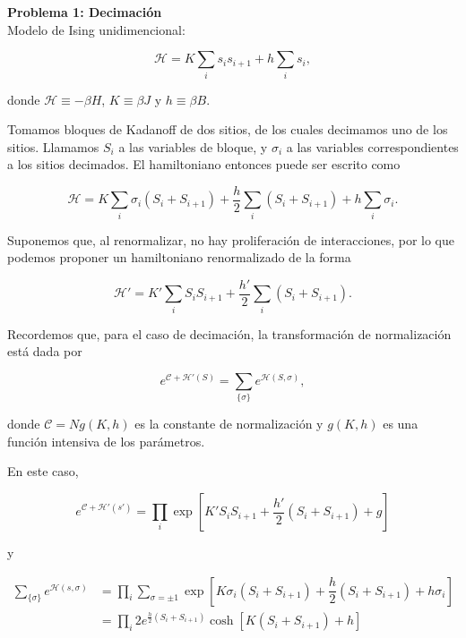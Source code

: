 \documentclass[10pt]{article}
\begin{document}
\textbf{Problema 1: Decimaci\'on}
\\

Modelo de Ising unidimencional:

\begin{equation}
\mathcal{H} = K \sum_i s_i s_{i+1} + h \sum_i s_i,
\end{equation}

donde $\mathcal{H} \equiv -\beta H$, $K\equiv \beta J$ y $h \equiv \beta B$.

Tomamos bloques de Kadanoff de dos sitios, de los cuales decimamos uno de los sitios. Llamamos $S_i$ a las variables de bloque, y $\sigma_i$ a las variables correspondientes a los sitios decimados. El hamiltoniano entonces puede ser escrito como

\begin{equation}
\mathcal{H} = K \sum_i \sigma_i (S_i + S_{i+1}) + \dfrac{h}{2} \sum_i (S_i + S_{i+1}) + h \sum_i \sigma_i.
\end{equation}

Suponemos que, al renormalizar, no hay proliferaci\'on de interacciones, por lo que podemos proponer un hamiltoniano renormalizado de la forma

\begin{equation}
\mathcal{H}' = K' \sum_i S_i S_{i+1} + \dfrac{h'}{2} \sum_i (S_i + S_{i+1}).
\end{equation}

Recordemos que, para el caso de decimaci\'on, la transformaci\'on de normalizaci\'on est\'a dada por 

\begin{equation}
e^{\mathcal{C} + \mathcal{H}'(S)} = \sum_{\lbrace \sigma\rbrace} e^{\mathcal{H}(S,\sigma)},
\end{equation}

donde $\mathcal{C} = Ng(K,h)$ es la constante de normalizaci\'on y $g(K,h)$ es una funci\'on intensiva de los par\'ametros.

En este caso,

\begin{equation}
e^{\mathcal{C} + \mathcal{H}'(s')} = \prod_i \exp\left[  K' S_i S_{i+1} + \dfrac{h'}{2} (S_i + S_{i+1}) + g \right]
\end{equation}

y

\begin{align}
\sum_{\lbrace \sigma \rbrace} e^{\mathcal{H}(s,\sigma)} &= \prod_i \sum_{\sigma=\pm 1} \exp\left[  K \sigma_i (S_i + S_{i+1}) + \dfrac{h}{2} (S_i + S_{i+1}) + h \sigma_i \right] \nonumber \\
&=  \prod_i 2 e^{\frac{h}{2} (S_i + S_{i+1}) }  \cosh\left[ K (S_i + S_{i+1}) + h \right] \nonumber
\end{align}
\end{document}
